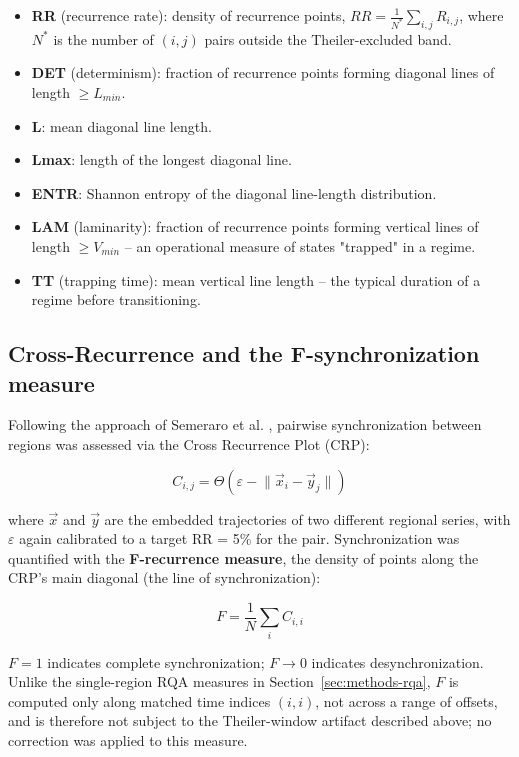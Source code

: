 \documentclass[climate,article,submit,moreauthors]{Definitions/mdpi}
\begin{document}
\begin{itemize}
  \item \textbf{RR} (recurrence rate): density of recurrence points,
  $RR = \frac{1}{N^*}\sum_{i,j} R_{i,j}$, where $N^*$ is the number of $(i,j)$
  pairs outside the Theiler-excluded band.
  \item \textbf{DET} (determinism): fraction of recurrence points forming
  diagonal lines of length $\geq L_{min}$.
  \item \textbf{L}: mean diagonal line length.
  \item \textbf{Lmax}: length of the longest diagonal line.
  \item \textbf{ENTR}: Shannon entropy of the diagonal line-length distribution.
  \item \textbf{LAM} (laminarity): fraction of recurrence points forming
  vertical lines of length $\geq V_{min}$ -- an operational measure of states
  "trapped" in a regime.
  \item \textbf{TT} (trapping time): mean vertical line length -- the typical
  duration of a regime before transitioning.
\end{itemize}

\subsection{Cross-Recurrence and the F-synchronization measure}
\label{sec:methods-crp}

Following the approach of Semeraro et al. \cite{Semeraro2020}, pairwise synchronization between regions was
assessed via the Cross Recurrence Plot (CRP):

\begin{equation}
C_{i,j} = \Theta(\varepsilon - \lVert \vec{x}_i - \vec{y}_j \rVert)
\label{eq:crp}
\end{equation}

where $\vec{x}$ and $\vec{y}$ are the embedded trajectories of two different
regional series, with $\varepsilon$ again calibrated to a target RR = 5\% for
the pair. Synchronization was quantified with the \textbf{F-recurrence measure},
the density of points along the CRP's main diagonal (the line of
synchronization):

\begin{equation}
F = \frac{1}{N}\sum_i C_{i,i}
\label{eq:frecurrence}
\end{equation}

$F=1$ indicates complete synchronization; $F \to 0$ indicates desynchronization.
Unlike the single-region RQA measures in Section~\ref{sec:methods-rqa}, $F$ is
computed only along matched time indices $(i,i)$, not across a range of
offsets, and is therefore not subject to the Theiler-window artifact described
above; no correction was applied to this measure.
\end{document}
